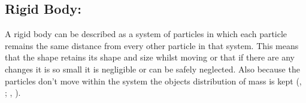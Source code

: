 \subsection{Rigid Body:}
A rigid body can be described as a system of particles in which each particle remains the same distance from every other particle in that system.
This means that the shape retains its shape and size whilst moving or that if there are any changes it is so small it is negligible or can be safely neglected.
Also because the particles don't move within the system the objects distribution of mass is kept (\citeauthor{bourg2013physics}, \citeyear{bourg2013physics}; \citeauthor{mactaggart2013l5}, \citeyear{mactaggart2013l5}). 